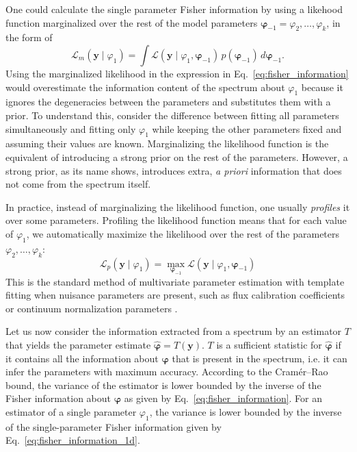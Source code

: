 \documentclass[twocolumn]{aastex7}
\newcommand{\m}[1]{\boldsymbol{#1}}
\begin{document}
One could calculate the single parameter Fisher information by using a likehood function marginalized over the rest of the model parameters $\m{\varphi}_{-1} = \varphi_2,\dots,\varphi_k$, in the form of
\begin{equation}
    \mathcal{L}_m(\m{y}\mid\varphi_1) = \int \mathcal{L}(\m{y}\mid\varphi_1, \m{\varphi}_{-1}) \, p(\m{\varphi}_{-1}) \, d\m{\varphi}_{-1}.
\end{equation}
Using the marginalized likelihood in the expression in Eq.~\ref{eq:fisher_information} would overestimate the information content of the spectrum about $\varphi_1$ because it ignores the degeneracies between the parameters and substitutes them with a prior. To understand this, consider the difference between fitting all parameters simultaneously and fitting only $\varphi_1$ while keeping the other parameters fixed and assuming their values are known. Marginalizing the likelihood function is the equivalent of introducing a strong prior on the rest of the parameters. However, a strong prior, as its name shows, introduces extra, \textit{a priori} information that does not come from the spectrum itself.

In practice, instead of marginalizing the likelihood function, one usually \textit{profiles} it over some parameters. Profiling the likelihood function means that for each value of $\varphi_1$, we automatically maximize the likelihood over the rest of the parameters $\varphi_2,\dots,\varphi_k$:
\begin{equation}
    \mathcal{L}_p(\m{y}\mid\varphi_1) = \max_{\m{\varphi}_{-1}} \mathcal{L}(\m{y}\mid\varphi_1,\m{\varphi}_{-1})
\end{equation}
This is the standard method of multivariate parameter estimation with template fitting when nuisance parameters are present, such as flux calibration coefficients or continuum normalization parameters \citep{2024Dobos_rv}.

Let us now consider the information extracted from a spectrum by an estimator $T$ that yields the parameter estimate $\hat{\m{\varphi}} = T(\m{y})$. $T$ is a sufficient statistic for $\hat{\m{\varphi}}$ if it contains all the information about $\m{\varphi}$ that is present in the spectrum, i.e. it can infer the parameters with maximum accuracy. According to the Cramér--Rao bound, the variance of the estimator is lower bounded by the inverse of the Fisher information about $\m{\varphi}$ as given by Eq.~\ref{eq:fisher_information}. For an estimator of a single parameter $\varphi_1$, the variance is lower bounded by the inverse of the single-parameter Fisher information given by Eq.~\ref{eq:fisher_information_1d}. 
\end{document}
